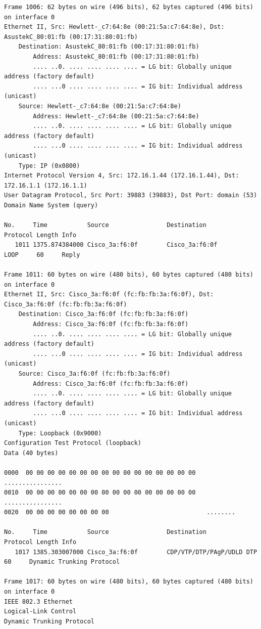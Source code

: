 \documentclass[a4paper,11pt]{article}
\begin{document}
\begin{lstlisting}
Frame 1006: 62 bytes on wire (496 bits), 62 bytes captured (496 bits) on interface 0
Ethernet II, Src: Hewlett-_c7:64:8e (00:21:5a:c7:64:8e), Dst: AsustekC_80:01:fb (00:17:31:80:01:fb)
    Destination: AsustekC_80:01:fb (00:17:31:80:01:fb)
        Address: AsustekC_80:01:fb (00:17:31:80:01:fb)
        .... ..0. .... .... .... .... = LG bit: Globally unique address (factory default)
        .... ...0 .... .... .... .... = IG bit: Individual address (unicast)
    Source: Hewlett-_c7:64:8e (00:21:5a:c7:64:8e)
        Address: Hewlett-_c7:64:8e (00:21:5a:c7:64:8e)
        .... ..0. .... .... .... .... = LG bit: Globally unique address (factory default)
        .... ...0 .... .... .... .... = IG bit: Individual address (unicast)
    Type: IP (0x0800)
Internet Protocol Version 4, Src: 172.16.1.44 (172.16.1.44), Dst: 172.16.1.1 (172.16.1.1)
User Datagram Protocol, Src Port: 39883 (39883), Dst Port: domain (53)
Domain Name System (query)

No.     Time           Source                Destination           Protocol Length Info
   1011 1375.874384000 Cisco_3a:f6:0f        Cisco_3a:f6:0f        LOOP     60     Reply

Frame 1011: 60 bytes on wire (480 bits), 60 bytes captured (480 bits) on interface 0
Ethernet II, Src: Cisco_3a:f6:0f (fc:fb:fb:3a:f6:0f), Dst: Cisco_3a:f6:0f (fc:fb:fb:3a:f6:0f)
    Destination: Cisco_3a:f6:0f (fc:fb:fb:3a:f6:0f)
        Address: Cisco_3a:f6:0f (fc:fb:fb:3a:f6:0f)
        .... ..0. .... .... .... .... = LG bit: Globally unique address (factory default)
        .... ...0 .... .... .... .... = IG bit: Individual address (unicast)
    Source: Cisco_3a:f6:0f (fc:fb:fb:3a:f6:0f)
        Address: Cisco_3a:f6:0f (fc:fb:fb:3a:f6:0f)
        .... ..0. .... .... .... .... = LG bit: Globally unique address (factory default)
        .... ...0 .... .... .... .... = IG bit: Individual address (unicast)
    Type: Loopback (0x9000)
Configuration Test Protocol (loopback)
Data (40 bytes)

0000  00 00 00 00 00 00 00 00 00 00 00 00 00 00 00 00   ................
0010  00 00 00 00 00 00 00 00 00 00 00 00 00 00 00 00   ................
0020  00 00 00 00 00 00 00 00                           ........

No.     Time           Source                Destination           Protocol Length Info
   1017 1385.303007000 Cisco_3a:f6:0f        CDP/VTP/DTP/PAgP/UDLD DTP      60     Dynamic Trunking Protocol

Frame 1017: 60 bytes on wire (480 bits), 60 bytes captured (480 bits) on interface 0
IEEE 802.3 Ethernet 
Logical-Link Control
Dynamic Trunking Protocol


\end{lstlisting}
\end{document}
